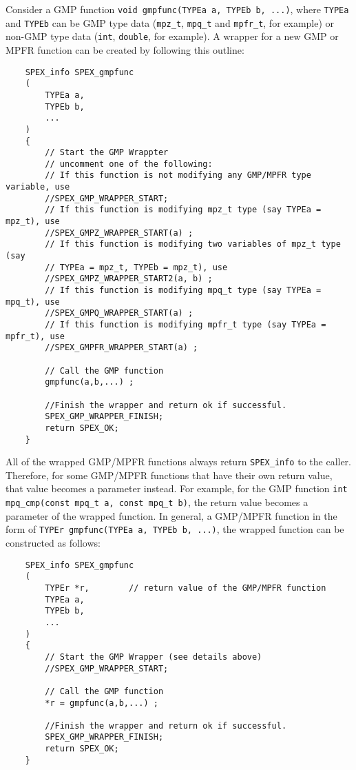 \documentclass[12pt,oneside]{book}
\theoremstyle{definition}
\begin{document}
Consider a GMP function \verb|void gmpfunc(TYPEa a, TYPEb b, ...)|, where
\verb|TYPEa| and \verb|TYPEb| can be GMP type data (\verb|mpz_t|,
\verb|mpq_t| and \verb|mpfr_t|, for example) or non-GMP type data (\verb|int|,
\verb|double|, for example).
A wrapper for a new GMP or MPFR function can be created by following
this outline:

\begin{mdframed}[userdefinedwidth=\textwidth]
{\footnotesize
\begin{verbatim}
    SPEX_info SPEX_gmpfunc
    (
        TYPEa a,
        TYPEb b,
        ...
    )
    {
        // Start the GMP Wrappter
        // uncomment one of the following:
        // If this function is not modifying any GMP/MPFR type variable, use
        //SPEX_GMP_WRAPPER_START;
        // If this function is modifying mpz_t type (say TYPEa = mpz_t), use
        //SPEX_GMPZ_WRAPPER_START(a) ;
        // If this function is modifying two variables of mpz_t type (say
        // TYPEa = mpz_t, TYPEb = mpz_t), use
        //SPEX_GMPZ_WRAPPER_START2(a, b) ;
        // If this function is modifying mpq_t type (say TYPEa = mpq_t), use
        //SPEX_GMPQ_WRAPPER_START(a) ;
        // If this function is modifying mpfr_t type (say TYPEa = mpfr_t), use
        //SPEX_GMPFR_WRAPPER_START(a) ;
    
        // Call the GMP function
        gmpfunc(a,b,...) ;
    
        //Finish the wrapper and return ok if successful.
        SPEX_GMP_WRAPPER_FINISH;
        return SPEX_OK;
    }
\end{verbatim}
} \end{mdframed}

All of the wrapped GMP/MPFR
functions always return \verb|SPEX_info| to the caller. Therefore, for some
GMP/MPFR functions that have their own return value, that value becomes a parameter instead.
For example, for the GMP function \newline
\verb|int mpq_cmp(const mpq_t a, const mpq_t b)|, the return value becomes a
parameter of the wrapped function. In general, a GMP/MPFR function in the form
of \newline \verb|TYPEr gmpfunc(TYPEa a, TYPEb b, ...)|, the wrapped
function can be constructed as follows:

\newpage
\begin{mdframed}[userdefinedwidth=\textwidth]
{\footnotesize
\begin{verbatim}
    SPEX_info SPEX_gmpfunc
    (
        TYPEr *r,        // return value of the GMP/MPFR function
        TYPEa a,
        TYPEb b,
        ...
    )
    {
        // Start the GMP Wrapper (see details above)
        //SPEX_GMP_WRAPPER_START;
    
        // Call the GMP function
        *r = gmpfunc(a,b,...) ;
    
        //Finish the wrapper and return ok if successful.
        SPEX_GMP_WRAPPER_FINISH;
        return SPEX_OK;
    }
\end{verbatim}
} \end{mdframed}
\end{document}
